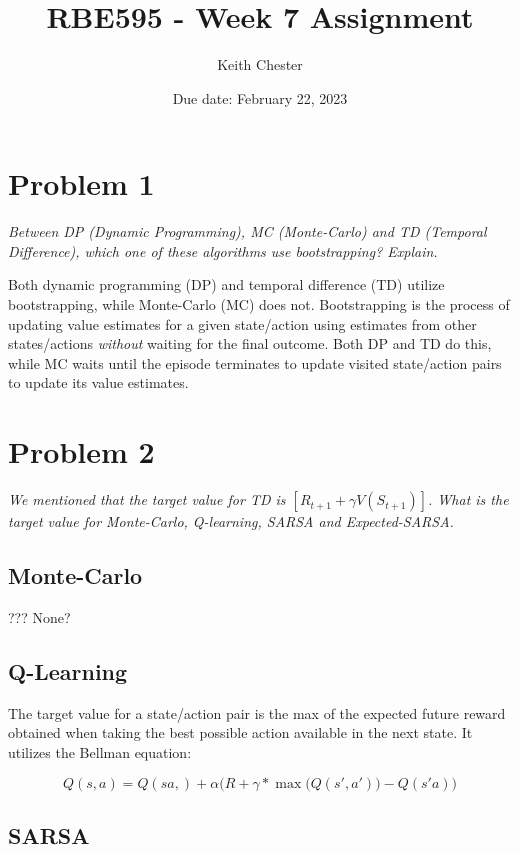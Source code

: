 \documentclass{article}
\title{RBE595 - Week 7 Assignment}
\author{Keith Chester}
\date{Due date: February 22, 2023}
\begin{document}
\maketitle

\section*{Problem 1}
\textit{Between DP (Dynamic Programming), MC (Monte-Carlo) and TD (Temporal Difference), which
    one of these algorithms use bootstrapping? Explain. }

Both dynamic programming (DP) and temporal difference (TD) utilize bootstrapping, while Monte-Carlo (MC) does not. Bootstrapping is the process of updating value estimates for a given state/action using estimates from other states/actions \textit{without} waiting for the final outcome. Both DP and TD do this, while MC waits until the episode terminates to update visited state/action pairs to update its value estimates.

\section*{Problem 2}
\textit{We mentioned that the target value for TD is $[R_{t+1} + \gamma V(S_{t+1})]$. What is the target value for Monte-Carlo, Q-learning, SARSA and Expected-SARSA.}

\subsection*{Monte-Carlo}

??? None?

\subsection*{Q-Learning}

The target value for a state/action pair is the max of the expected future reward obtained when taking the best possible action available in the next state. It utilizes the Bellman equation:

\begin{equation}
    Q(s,a) = Q(sa,) + \alpha \biggl( R + \gamma * \max\bigl(Q(s',a')\bigr) - Q(s'a) \biggr)
\end{equation}

\subsection*{SARSA}
\end{document}
